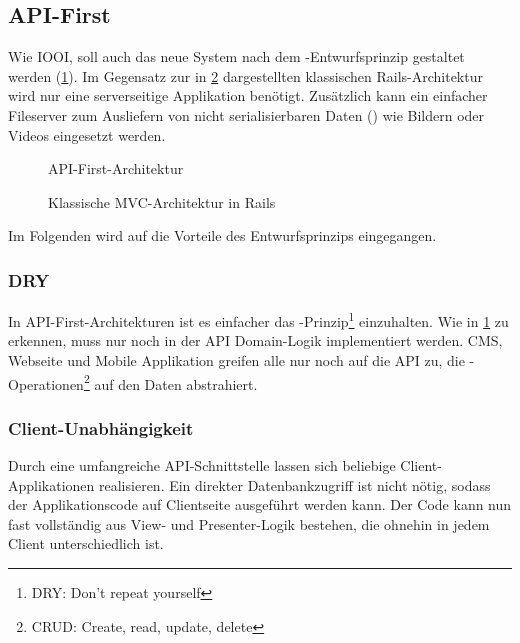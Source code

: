 \subsection{API-First}
\label{ssec:ea_api_first}

Wie IOOI, soll auch das neue System nach dem
-Entwurfsprinzip \cite{api-first} gestaltet werden
(\cref{fig:api_first_architektur}).  Im Gegensatz zur in
\cref{fig:klassische_rails_architektur} dargestellten klassischen
Rails-Architektur wird nur eine serverseitige Applikation benötigt.  Zusätzlich
kann ein einfacher Fileserver zum Ausliefern von nicht serialisierbaren Daten
() wie Bildern oder Videos eingesetzt werden.

\begin{figure}[h]
	\centering
	
	\caption{API-First-Architektur}
	\label{fig:api_first_architektur}
\end{figure}

\begin{figure}[h]
	\centering
	
	\caption{Klassische MVC-Architektur in Rails}
	\label{fig:klassische_rails_architektur}
\end{figure}

Im Folgenden wird auf die Vorteile des Entwurfsprinzips eingegangen.

\subsubsection{DRY}
\label{sssec:eaa_dry}

In API-First-Architekturen ist es einfacher das
-Prinzip\footnote{DRY: Don't repeat yourself} einzuhalten.  Wie
in \cref{fig:api_first_architektur} zu erkennen, muss nur noch in der
API Domain-Logik implementiert werden.  CMS, Webseite und Mobile Applikation
greifen alle nur noch auf die API zu, die
-Operationen\footnote{CRUD: Create, read, update,
delete} auf den Daten abstrahiert.

\subsubsection{Client-Unabhängigkeit}
\label{sssec:eaa_client_unabhaengigkeit}

Durch eine umfangreiche API-Schnittstelle lassen sich beliebige
Client-Applikationen realisieren.  Ein direkter Datenbankzugriff ist nicht
nötig, sodass der Applikationscode auf Clientseite ausgeführt werden kann.  Der
Code kann nun fast vollständig aus View- und Presenter-Logik bestehen, die
ohnehin in jedem Client unterschiedlich ist.

